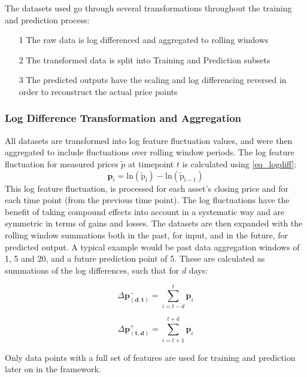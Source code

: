 \documentclass[a4paper,11pt,oneside]{article}
\theoremstyle{plain}
\theoremstyle{definition}
\begin{document}
The datasets used go through several transformations throughout the training and prediction process:

\begin{itemize}
	\item [1] The raw data is log differenced and aggregated to rolling windows
	\item [2] The transformed data is split into Training and Prediction subsets
	\item [3] The predicted outputs have the scaling and log differencing reversed in order to reconstruct the actual price points
\end{itemize}

\subsubsection{Log Difference Transformation and Aggregation}\label{ldata_og_difference}
All datasets are transformed into log feature fluctuation values, and were then aggregated to include fluctuations over rolling window periods. The log feature fluctuation for measured prices $\tilde{p}$ at timepoint $t$ is calculated using \eqref{eq_logdiff}:
\begin{equation}\label{eq_logdiff}
\mathbf{p}_i = \mathrm{ln(\tilde{p}_i) - \mathrm{ln}(\tilde{p}_{i-1})}
\end{equation}
This log feature fluctuation,  is processed for each asset's closing price and for each time point (from the previous time point). The log fluctuations have the benefit of taking compound effects into account in a systematic way and are symmetric in terms of gains and losses.
\newline\newline
The datasets are then expanded with the rolling window summations both in the past, for input, and in the future, for predicted output. A typical example would be past data aggregation windows of 1, 5 and 20, and a future prediction point of 5. These are calculated as summations of the log differences, such that for $d$ days:

\begin{equation}
\Delta \mathbf{p^{-}_{(d,t)}} = \sum_{i = t-d}^{t} \mathbf{p}_i
\end{equation}

\begin{equation}
\Delta \mathbf{p^{+}_{(t,d)}} = \sum_{i = t+1}^{t+d} \mathbf{p}_i
\end{equation}

Only data points with a full set of features are used for training and prediction later on in the framework.
\end{document}
